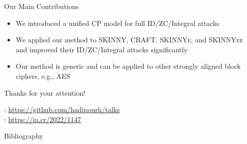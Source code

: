 \documentclass[table,aspectratio=169]{beamer}
\newcommand{\cipher}[1]{\textsc{#1}}
\begin{document}
\begin{frame}{Our Main Contributions}
\begin{itemize}
\item[\faCheckCircleO] We introduced a unified CP model for full ID/ZC/Integral attacks
\item[\faCheckCircleO] We applied our method to \cipher{SKINNY}, \cipher{CRAFT}, \cipher{SKINNYe}, and \cipher{SKINNYee} and improved their ID/ZC/Integral attacks significantly
\item[\faCheckCircleO] Our method is generic and can be applied to other strongly aligned block ciphers, e.g., \cipher{AES}
\end{itemize}

\begin{center}
\vspace{0.44cm}

{\large Thanks for your attention!}

\faGithub: \url{https://github.com/hadipourh/talks}\\
\vspace{0.35cm}
\faArchive: \url{https://ia.cr/2022/1147}
\end{center}
\end{frame}


\begin{frame}[allowframebreaks]{Bibliography}
  \printbibliography
\end{frame}
\end{document}
